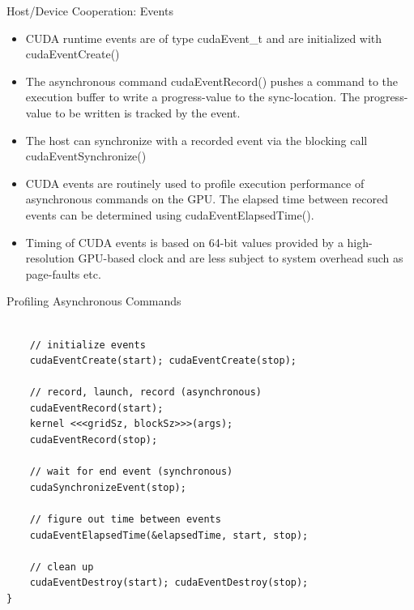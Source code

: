 \documentclass[handout]{beamer}
\begin{document}
\begin{frame}{Host/Device Cooperation: Events}
\begin{itemize}
	\item<1->CUDA runtime events are of type {\selectfont cudaEvent\_t} and are initialized with {\selectfont cudaEventCreate()}
	\item<1->The asynchronous command {\selectfont cudaEventRecord()} pushes a command to the execution buffer to write a progress-value to the sync-location.  The progress-value to be written is tracked by the event.
	\item<1->The host can synchronize with a recorded event via the blocking call {\selectfont cudaEventSynchronize()}
	\item<1->CUDA events are routinely used to profile execution performance of asynchronous commands on the GPU.  The elapsed time between recored events can be determined using {\selectfont cudaEventElapsedTime()}.  
	\item<1->Timing of CUDA events is based on 64-bit values provided by a high-resolution GPU-based clock and are less subject to system overhead such as page-faults etc.   
\end{itemize}
\end{frame}



\begin{frame}[fragile]{Profiling Asynchronous Commands}
\begin{lstlisting}[caption={Pattern for timing kernels and other asynchronous API calls}]
    
    // initialize events
    cudaEventCreate(start); cudaEventCreate(stop);
    
    // record, launch, record (asynchronous)
    cudaEventRecord(start);
    kernel <<<gridSz, blockSz>>>(args);
    cudaEventRecord(stop);
    
    // wait for end event (synchronous)
    cudaSynchronizeEvent(stop);
    
    // figure out time between events
    cudaEventElapsedTime(&elapsedTime, start, stop);
    
    // clean up
    cudaEventDestroy(start); cudaEventDestroy(stop);
}
\end{lstlisting}
\end{frame}
\end{document}
